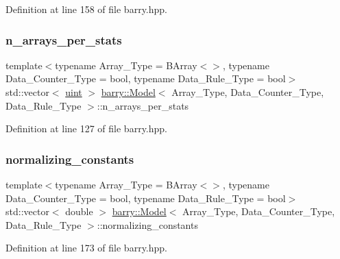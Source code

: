 Definition at line 158 of file barry.\+hpp.

\mbox{\label{classbarry_1_1_model_a6e72cbb235cf592668c286931a488830}} 
\subsubsection{\texorpdfstring{n\+\_\+arrays\+\_\+per\+\_\+stats}{n\_arrays\_per\_stats}}
{\footnotesize\ttfamily template$<$typename Array\+\_\+\+Type  = B\+Array$<$$>$, typename Data\+\_\+\+Counter\+\_\+\+Type  = bool, typename Data\+\_\+\+Rule\+\_\+\+Type  = bool$>$ \\
std\+::vector$<$ \hyperlink{namespacebarry_a11dfc53ddb4672278319aa04f1e09a6c}{uint} $>$ \hyperlink{classbarry_1_1_model}{barry\+::\+Model}$<$ Array\+\_\+\+Type, Data\+\_\+\+Counter\+\_\+\+Type, Data\+\_\+\+Rule\+\_\+\+Type $>$\+::n\+\_\+arrays\+\_\+per\+\_\+stats}



Definition at line 127 of file barry.\+hpp.

\mbox{\label{classbarry_1_1_model_a600630f5fad408c157b21404dbde4bc1}} 
\subsubsection{\texorpdfstring{normalizing\+\_\+constants}{normalizing\_constants}}
{\footnotesize\ttfamily template$<$typename Array\+\_\+\+Type  = B\+Array$<$$>$, typename Data\+\_\+\+Counter\+\_\+\+Type  = bool, typename Data\+\_\+\+Rule\+\_\+\+Type  = bool$>$ \\
std\+::vector$<$ double $>$ \hyperlink{classbarry_1_1_model}{barry\+::\+Model}$<$ Array\+\_\+\+Type, Data\+\_\+\+Counter\+\_\+\+Type, Data\+\_\+\+Rule\+\_\+\+Type $>$\+::normalizing\+\_\+constants}



Definition at line 173 of file barry.\+hpp.

\mbox{\label{classbarry_1_1_model_ace8577c5c0c7bd927a2337515155ab6f}} 
